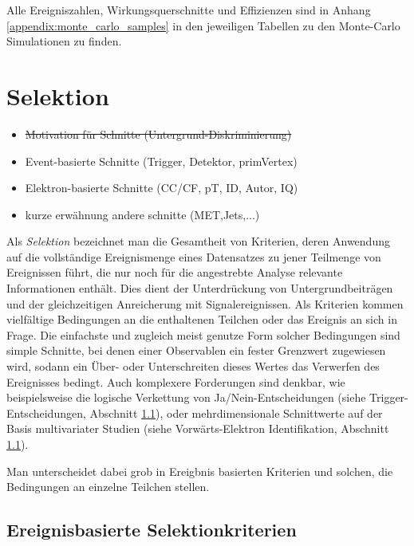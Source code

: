 Alle Ereigniszahlen, Wirkungsquerschnitte und Effizienzen sind in Anhang
\ref{appendix:monte_carlo_samples} in den jeweiligen Tabellen zu den
Monte-Carlo Simulationen zu finden.



\section{Selektion}
\label{data_sim_selection:selection}

\begin{itemize}
    \item \sout{Motivation für Schnitte (Untergrund-Diskriminierung)}
    \item Event-basierte Schnitte (Trigger, Detektor, primVertex)
    \item Elektron-basierte Schnitte (CC/CF, pT, ID, Autor, IQ)
    \item kurze erwähnung andere schnitte (MET,Jets,...)
\end{itemize}

Als \textit{Selektion} bezeichnet man die Gesamtheit von Kriterien, deren
Anwendung auf die vollständige Ereignismenge eines Datensatzes zu jener
Teilmenge von Ereignissen führt, die nur noch für die angestrebte Analyse
relevante Informationen enthält. Dies dient der Unterdrückung von
Untergrundbeiträgen und der gleichzeitigen Anreicherung mit Signalereignissen.
Als Kriterien kommen vielfältige Bedingungen an die enthaltenen Teilchen oder
das Ereignis an sich in Frage. Die einfachste und zugleich meist genutze Form
solcher Bedingungen sind simple Schnitte, bei denen einer Observablen ein
fester Grenzwert zugewiesen wird, sodann ein Über- oder Unterschreiten dieses
Wertes das Verwerfen des Ereignisses bedingt. Auch komplexere Forderungen sind
denkbar, wie beispielsweise die logische Verkettung von Ja/Nein-Entscheidungen
(siehe Trigger-Entscheidungen, Abschnitt \ref{}),
oder mehrdimensionale Schnittwerte auf der Basis multivariater Studien (siehe
Vorwärts-Elektron Identifikation, Abschnitt \ref{}).

Man unterscheidet dabei grob in Ereigbnis basierten Kriterien und solchen, die
Bedingungen an einzelne Teilchen stellen.

\subsection{Ereignisbasierte Selektionkriterien}






